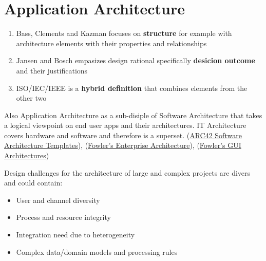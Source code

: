 \documentclass[../Main.tex]{subfiles}
\begin{document}
\chapter{Application Architecture}

\intro{

}


\begin{enumerate}
    \item Bass, Clements and Kazman focuses on \textbf{structure}
    for example with architecture elements with their properties
    and relationships
    \item Jansen and Bosch empasizes design rational specifically
    \textbf{desicion outcome} and their justifications
    \item ISO/IEC/IEEE is a \textbf{hybrid definition} that combines elements from the other two
\end{enumerate}

Also Application Architecture as a sub-disiple of Software Architecture
that takes a logical viewpoint on end user apps and their architectures.
IT Architecture covers hardware and software and therefore is a superset.
(\href{https://arc42.org/overview}{ARC42 Software Architecture Templates}),
(\href{https://martinfowler.com/eaaCatalog/index.html}{Fowler's Enterprise Architecture}),
(\href{https://martinfowler.com/eaaDev/uiArchs.html}{Fowler's GUI Architectures})

Design challenges for the architecture of large and complex projects are divers and could contain:
\begin{itemize}
    \item User and channel diversity
    \item Process and resource integrity
    \item Integration need due to heterogeneity
    \item Complex data/domain models and processing rules
\end{itemize}
\end{document}
